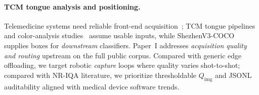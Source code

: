\paragraph{TCM tongue analysis and positioning.}
Telemedicine systems need reliable front-end acquisition~\cite{chen2021telemed}; TCM tongue pipelines and color-analysis studies~\cite{zhang2020tongue,qi2016tongue,huang2015tcn} assume usable inputs, while ShezhenV3-COCO supplies boxes for \emph{downstream} classifiers.
Paper~I addresses \emph{acquisition quality and routing} upstream on the full public corpus.
Compared with generic edge offloading, we target robotic \emph{capture} loops where quality varies shot-to-shot; compared with NR-IQA literature, we prioritize thresholdable $Q_{\mathrm{img}}$ and JSONL auditability aligned with medical device software trends.
